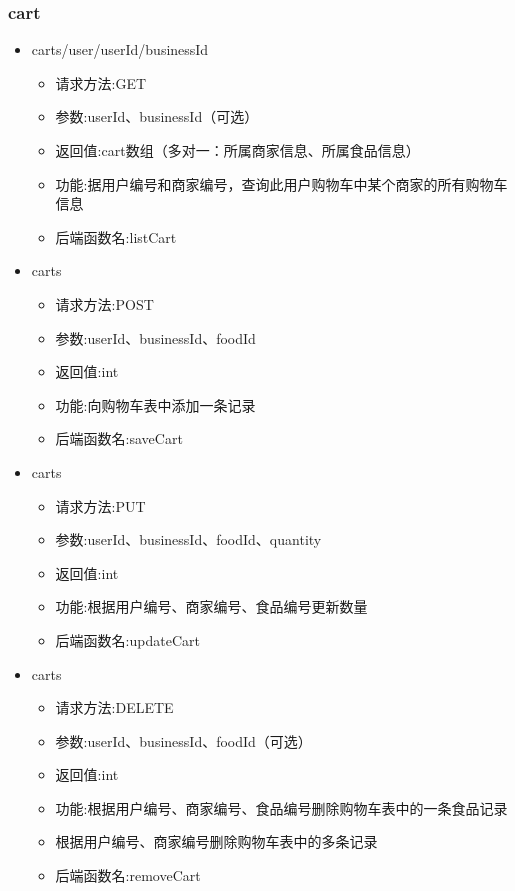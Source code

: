 \subsubsection*{cart}
\begin{itemize}
    \item  carts/user/{userId}/{businessId}
    \begin{itemize}
    \item 请求方法:GET
    \item 参数:userId、businessId（可选）
    \item 返回值:cart数组（多对一：所属商家信息、所属食品信息）
    \item 功能:据用户编号和商家编号，查询此用户购物车中某个商家的所有购物车信息
    \item 后端函数名:listCart
    \end{itemize}
    \item carts
    \begin{itemize}
    \item 请求方法:POST
    \item 参数:userId、businessId、foodId
    \item 返回值:int
    \item 功能:向购物车表中添加一条记录
    \item 后端函数名:saveCart
    \end{itemize}
    \item  carts
    \begin{itemize}
    \item 请求方法:PUT
    \item 参数:userId、businessId、foodId、quantity
    \item 返回值:int
    \item 功能:根据用户编号、商家编号、食品编号更新数量
    \item 后端函数名:updateCart
    \end{itemize}
    \item carts
    \begin{itemize}
    \item 请求方法:DELETE
    \item 参数:userId、businessId、foodId（可选）
    \item 返回值:int
    \item 功能:根据用户编号、商家编号、食品编号删除购物车表中的一条食品记录
    \item 根据用户编号、商家编号删除购物车表中的多条记录
    \item 后端函数名:removeCart
    \end{itemize}
\end{itemize}

